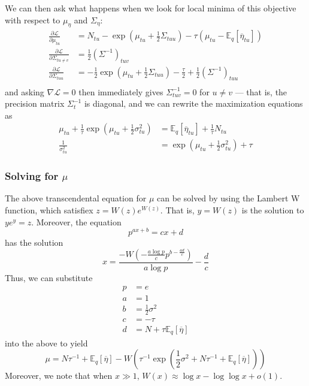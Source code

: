 \documentclass[11pt]{article}
\begin{document}
We can then ask what happens when we look for local minima of this objective with respect to $\mu_\eta$ and $\Sigma_\eta$:
\begin{align}
    \frac{\partial \mathcal{L}}{\partial \mu_{tu}} &= 
    N_{tu} - \exp\left(\mu_{tu} + \frac{1}{2} \Sigma_{tuu} \right) 
    - \tau(\mu_{tu} - \mathbb{E}_q[\overline{\eta}_{tu}]) \\
    \frac{\partial \mathcal{L}}{\partial \Sigma_{tu \neq v}} &= 
    \frac{1}{2} \left(\Sigma^{-1} \right)_{tuv} \\
    \frac{\partial \mathcal{L}}{\partial \Sigma_{tuu}} &= 
    -\frac{1}{2} \exp\left(\mu_{tu} + \frac{1}{2} \Sigma_{tuu} \right)
    - \frac{\tau}{2}
    + \frac{1}{2} \left(\Sigma^{-1} \right)_{tuu} \\
\end{align}
and asking $\nabla \mathcal{L} = 0$ then immediately gives $\Sigma^{-1}_{tuv} = 0$ for $u\neq v$ --- that is, the precision matrix $\Sigma^{-1}_t$ is diagonal, and we can rewrite the maximization equations as 
\begin{align}
    \mu_{tu} + \frac{1}{\tau}\exp\left(\mu_{tu} + \frac{1}{2} \sigma^2_{tu} \right)&= \mathbb{E}_q[\overline{\eta}_{tu}] + \frac{1}{\tau} N_{tu} \\
    \frac{1}{\sigma^2_{tu}} &= \exp\left(\mu_{tu} + \frac{1}{2}\sigma^2_{tu}\right) + \tau
\end{align}

\subsubsection{Solving for $\mu$}
The above transcendental equation for $\mu$ can be solved by using the Lambert W function, which satisfiex $z = W(z)e^{W(z)}$. That is, $y = W(z)$ is the solution to $ye^y = z$. Moreover, the equation
\begin{equation}
    p^{ax + b} = cx + d
\end{equation}
has the solution
\begin{equation}
    x = \frac{-W\left(-\frac{a \log p}{c} 
    p^{b - \frac{ad}{c}} \right)}{a \log p} - \frac{d}{c}
\end{equation}
Thus, we can substitute
\begin{align}
    p &= e \\
    a &= 1 \\
    b &= \frac{1}{2} \sigma^2 \\
    c &= -\tau \\
    d &= N + \tau \mathbb{E}_q[\overline{\eta}]
\end{align}
into the above to yield
\begin{equation}
    \mu = N\tau^{-1} + \mathbb{E}_q[\overline{\eta}] - 
    W\left(\tau^{-1} \exp \left( 
    \frac{1}{2}\sigma^2 + N\tau^{-1} + \mathbb{E}_q[\overline{\eta}]
    \right)\right)
\end{equation}
Moreover, we note that when $x \gg 1$, $W(x) \approx \log x - \log \log x + o(1)$.
\end{document}
